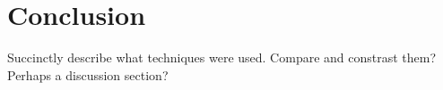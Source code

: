 \chapter{Conclusion}\label{chatper:Concl}

Succinctly describe what techniques were used.
Compare and constrast them? Perhaps a discussion section?